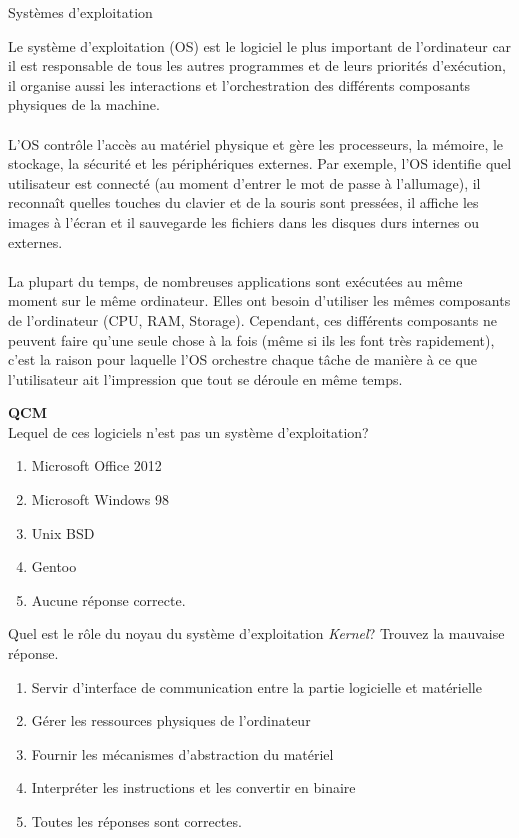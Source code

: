 \begin{section}{Systèmes d'exploitation}

Le système d'exploitation (OS) est le logiciel le plus important de l'ordinateur car il est responsable de tous les autres programmes et de leurs priorités d'exécution, il organise aussi les interactions et l'orchestration des différents composants physiques de la machine.
\\\\
L'OS contrôle l'accès au matériel physique et gère les processeurs, la mémoire, le stockage, la sécurité et les périphériques externes. Par exemple, l'OS identifie quel utilisateur est connecté (au moment d'entrer le mot de passe à l'allumage), il reconnaît quelles touches du clavier et de la souris sont pressées, il affiche les images à l'écran et il sauvegarde les fichiers dans les disques durs internes ou externes.
\\\\
La plupart du temps, de nombreuses applications sont exécutées au même moment sur le même ordinateur. Elles ont besoin d'utiliser les mêmes composants de l'ordinateur (CPU, RAM, Storage). Cependant, ces différents composants ne peuvent faire qu'une seule chose à la fois (même si ils les font très rapidement), c'est la raison pour laquelle l'OS orchestre chaque tâche de manière à ce que l'utilisateur ait l'impression que tout se déroule en même temps.
\\

    \begin{Exercice}[5 minutes]  \textbf{QCM}\\
    Lequel de ces logiciels n'est pas un système d'exploitation?
        \begin{enumerate}
            \item Microsoft Office 2012
            \item Microsoft Windows 98
            \item Unix BSD
            \item Gentoo
            \item Aucune réponse correcte.
        \end{enumerate}
    \end{Exercice}

    \begin{Exercice}[5 minutes]
        Quel est le rôle du noyau du système d'exploitation \textit{Kernel}? Trouvez la mauvaise réponse.
        \begin{enumerate}
            \item Servir d'interface de communication entre la partie logicielle et matérielle
            \item Gérer les ressources physiques de l'ordinateur
            \item Fournir les mécanismes d'abstraction du matériel
            \item Interpréter les instructions et les convertir en binaire
            \item Toutes les réponses sont correctes.
        \end{enumerate}
    \end{Exercice}


\end{section}
